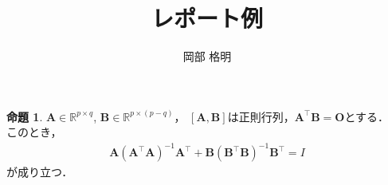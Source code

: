 \documentclass[dvipdfmx,10pt, a4j]{jarticle}
\title{レポート例}
\author{岡部 格明}
\theoremstyle{definition}
\newtheorem{proposition}[theorem]{命題}
\begin{document}
\maketitle


\begin{proposition}
$\bm{A} \in \mathbb{R}^{p\times q}$, $\bm{B} \in \mathbb{R}^{p\times (p-q)}$， $[\bm{A},\bm{B}]$は正則行列，$\bm{A}^{\top}\bm{B} = \bm{O}$とする．\\
このとき，
\begin{align}
    \bm{A}(\bm{A}^{\top}\bm{A})^{-1}\bm{A}^{\top} + \bm{B}(\bm{B}^{\top}\bm{B})^{-1}\bm{B}^{\top} = I
\end{align}
が成り立つ．
\end{proposition}
\end{document}
